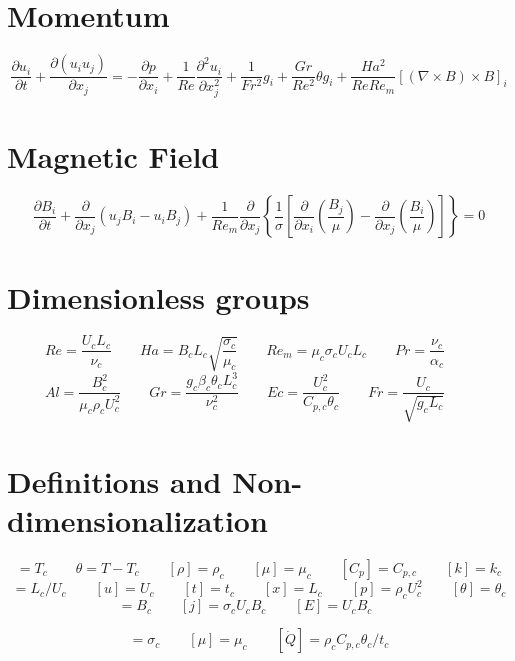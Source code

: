 \documentclass[11pt]{article}
\begin{document}
\section{Momentum}
\begin{equation}
	\frac{\partial u_i}{\partial t} + 
	\frac{\partial (u_i u_j)}{\partial x_j}
	= 
	- \frac{\partial p}{\partial x_i}
	+ \frac{1}{Re}
	\frac{\partial^2 u_i}{\partial x_j^2}
	+ \frac{1}{Fr^2}
	g_i
	+ \frac{Gr}{Re^2}
	\theta g_i
	+ \frac{Ha^2}{Re Re_m}
	[(\nabla \times B) \times B]_i
\end{equation}
\section{Magnetic Field}
\begin{equation}
	\frac{\partial B_i}{\partial t} 
	+ \frac{\partial}{\partial x_j} (u_j B_i - u_i B_j) 
	+ \frac{1}{Re_m}
	\frac{\partial}{\partial x_j} 
	\left\{ \frac{1}{\sigma} 
	\left[ 
	\frac{\partial}{\partial x_i} 
	\left( \frac{B_j}{\mu} \right) - 
	\frac{\partial}{\partial x_j} 
	\left( \frac{B_i}{\mu} \right)
	\right]
	\right\} = 0
\end{equation}

\section{Dimensionless groups}
\begin{equation}
	Re = \frac{U_c L_c}{\nu_c} \qquad
	Ha = B_c L_c \sqrt{\frac{\sigma_c}{\mu_c}} \qquad
	Re_m = \mu_c \sigma_c U_c L_c \qquad
	Pr = \frac{\nu_c}{\alpha_c} \qquad
\end{equation}
\begin{equation}
	Al = \frac{B_c^2}{\mu_c \rho_c U_c^2} \qquad
	Gr = \frac{g_c \beta_c \theta_c L_c^3}{\nu_c^2} \qquad
	Ec = \frac{U_c^2}{C_{p,c} \theta_c} \qquad
	Fr = \frac{U_c}{\sqrt{g_c L_c}} \qquad
\end{equation}
\section{Definitions and Non-dimensionalization}
\begin{equation}
	[T] = T_c \qquad
	\theta = T-T_c \qquad
	[\rho] = \rho_c \qquad
	[\mu] = \mu_c \qquad
	[C_p] = C_{p,c} \qquad
	[k] = k_c
\end{equation}
\begin{equation}
	[t_c] = L_c/U_c \qquad
	[u] = U_c \qquad
	[t] = t_c \qquad
	[x] = L_c \qquad
	[p] = \rho_c U_c^2 \qquad
	[\theta] = \theta_c
\end{equation}
\begin{equation}
	[B] = B_c  \qquad
	[j] = \sigma_c U_c B_c \qquad
	[E] = U_c B_c \qquad
\end{equation}

\begin{equation}
	[\sigma] = \sigma_c \qquad
	[\mu] = \mu_c \qquad
	[\dot{Q}] = \rho_c C_{p,c} \theta_c / t_c
\end{equation}
\end{document}
